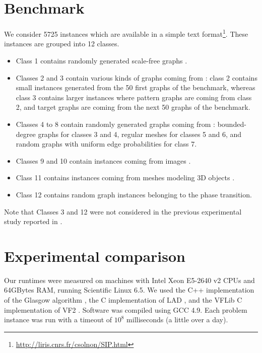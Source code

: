 \documentclass{llncs}
\begin{document}
\section{Benchmark}

We consider 5725 instances which are available in a simple text format\footnote{\url{http://liris.cnrs.fr/csolnon/SIP.html}}. These instances are grouped into 12 classes.
\begin{itemize}
\item Class 1 contains randomly generated scale-free graphs \cite{}.
\item Classes 2 and 3 contain various kinds of graphs coming from \cite{}: class 2 contains small instances generated from the 50 first graphs of the benchmark, whereas class 3 contains larger instances where pattern graphs are coming from class 2, and target graphs are coming from the next 50 graphs of the benchmark.
\item Classes 4 to 8 contain randomly generated graphs coming from \cite{GraphDatabase}: bounded-degree graphs for classes 3 and 4, regular meshes for classes 5 and 6, and random graphs with uniform edge probabilities for class 7.
\item Classes 9 and 10 contain instances coming from images \cite{}.
\item Class 11 contains instances coming from meshes modeling 3D objects \cite{}.
\item Class 12 contains random graph instances belonging to the phase transition.
\end{itemize}
Note that Classes 3 and 12 were not considered in the previous experimental study reported in \cite{McCreesh:2015}.


\section{Experimental comparison}

Our runtimes were measured on machines with Intel Xeon E5-2640 v2 CPUs and 64GBytes RAM, running Scientific Linux 6.5. We used the C++ implementation of the Glasgow algorithm \cite{McCreesh:2015}, the C implementation of LAD \cite{Solnon:2010}, and the VFLib C implementation of VF2 \cite{Cordella:2004}. Software was compiled using GCC 4.9. Each problem instance was run with a timeout of $10^8$ milliseconds (a little over a day).
\end{document}
